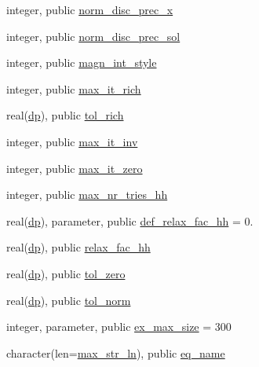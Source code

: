 \begin{DoxyCompactItemize}
\item 
integer, public \hyperlink{namespacenum__vars_acba4a05e477f116855028f2057ce4e49}{norm\+\_\+disc\+\_\+prec\+\_\+x}
\item 
integer, public \hyperlink{namespacenum__vars_a125bbc64ad3fac6752bc64e4222c6f50}{norm\+\_\+disc\+\_\+prec\+\_\+sol}
\item 
integer, public \hyperlink{namespacenum__vars_af0177cf335f43b5d27d9a016770c8f7a}{magn\+\_\+int\+\_\+style}
\item 
integer, public \hyperlink{namespacenum__vars_afbd4cb9a4ef9e8a277aecfc41b09aa1d}{max\+\_\+it\+\_\+rich}
\item 
real(\hyperlink{namespacenum__vars_a03802aa2bd86439d7a9370836fabf3f2}{dp}), public \hyperlink{namespacenum__vars_aa0091a935b9502afef09a87c0f590e9d}{tol\+\_\+rich}
\item 
integer, public \hyperlink{namespacenum__vars_a5a210aad14931202fd7b445852f17e06}{max\+\_\+it\+\_\+inv}
\item 
integer, public \hyperlink{namespacenum__vars_ad35971574ecb900c805b8d08745160e6}{max\+\_\+it\+\_\+zero}
\item 
integer, public \hyperlink{namespacenum__vars_a1534dcf4c47d82dfcd36ff91d4d38e31}{max\+\_\+nr\+\_\+tries\+\_\+hh}
\item 
real(\hyperlink{namespacenum__vars_a03802aa2bd86439d7a9370836fabf3f2}{dp}), parameter, public \hyperlink{namespacenum__vars_a9782d64dd6f481ae89e01228c46197ea}{def\+\_\+relax\+\_\+fac\+\_\+hh} = 0.
\item 
real(\hyperlink{namespacenum__vars_a03802aa2bd86439d7a9370836fabf3f2}{dp}), public \hyperlink{namespacenum__vars_a04aa07618c0f33df6107f2deb0240f59}{relax\+\_\+fac\+\_\+hh}
\item 
real(\hyperlink{namespacenum__vars_a03802aa2bd86439d7a9370836fabf3f2}{dp}), public \hyperlink{namespacenum__vars_ae2387f8182114da91104322ca3250d9a}{tol\+\_\+zero}
\item 
real(\hyperlink{namespacenum__vars_a03802aa2bd86439d7a9370836fabf3f2}{dp}), public \hyperlink{namespacenum__vars_a301b25f19135f2bee8ccce99257ae86c}{tol\+\_\+norm}
\item 
integer, parameter, public \hyperlink{namespacenum__vars_a032fd6a1d45689b56362d8aab1cdc57c}{ex\+\_\+max\+\_\+size} = 300
\item 
character(len=\hyperlink{namespacenum__vars_a3ff2bb983ee80a6735277d6789e6ce7c}{max\+\_\+str\+\_\+ln}), public \hyperlink{namespacenum__vars_a3cc0fc4b1538f7203be1604cb4f7c9bc}{eq\+\_\+name}
\item 

\end{DoxyCompactItemize}
